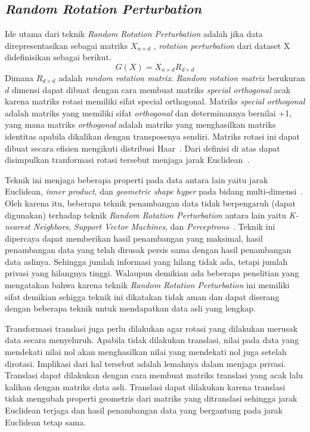 \subsection{\textit{Random Rotation Perturbation}}
\label{subsec:rrp}

Ide utama dari teknik \textit{Random Rotation Perturbation} adalah jika data direpresentasikan sebagai matriks \(X_{n \times d}\) , \textit{rotation perturbation} dari dataset X didefinisikan sebagai berikut.
\begin{equation}
	G(X) = X_{n \times d} R_{d \times d}
\end{equation}
Dimana \(R_{d \times d}\) adalah \textit{random rotation matrix}. \textit{Random rotation matrix} berukuran \(d\) dimensi dapat dibuat dengan cara membuat matriks \textit{special orthogonal} acak karena matriks rotasi memiliki sifat {special orthogonal}. Matriks \textit{special orthogonal} adalah matriks yang memiliki sifat \textit{orthogonal} dan determinannya bernilai +1, yang mana matriks \textit{orthogonal} adalah matriks yang menghasilkan matriks identitas apabila dikalikan dengan transposenya sendiri. Matriks rotasi ini dapat dibuat secara efisien mengikuti distribusi Haar~\cite{stewart:80:orthogonal}. Dari definisi di atas dapat disimpulkan tranformasi rotasi tersebut menjaga jarak Euclidean~\cite{rotation:05:chenliu}.

Teknik ini menjaga beberapa properti pada data antara lain yaitu jarak Euclidean, \textit{inner product}, dan \textit{geometric shape hyper} pada bidang multi-dimensi~\cite{rezaseifi:11:ppdm}. Oleh karena itu, beberapa teknik penambangan data tidak berpengaruh (dapat digunakan) terhadap teknik \textit{Random Rotation Perturbation} antara lain yaitu \textit{K-nearest Neighbors}, \textit{Support Vector Machines}, dan \textit{Perceptrons}~\cite{rotation:05:chenliu}. Teknik ini dipercaya dapat memberikan hasil penambangan yang maksimal, hasil penambangan data yang telah dirusak persis sama dengan hasil penambangan data aslinya. Sehingga jumlah informasi yang hilang tidak ada, tetapi jumlah privasi yang hilangnya tinggi. Walaupun demikian ada beberapa penelitian yang mengatakan bahwa karena teknik \textit{Random Rotation Perturbation} ini memiliki sifat demikian sehigga teknik ini dikatakan tidak aman dan dapat diserang dengan beberapa teknik untuk mendapatkan data asli yang lengkap.

Transformasi translasi juga perlu dilakukan agar rotasi yang dilakukan merusak data secara menyeluruh. Apabila tidak dilakukan translasi, nilai pada data yang mendekati nilai nol akan menghasilkan nilai yang mendekati nol juga setelah dirotasi. Implikasi dari hal tersebut adalah lemahnya dalam menjaga privasi. Translasi dapat dilakukan dengan cara membuat matriks translasi yang acak lalu kalikan dengan matriks data asli. Translasi dapat dilakukan karena translasi tidak mengubah properti geometris dari matriks yang ditranslasi sehingga jarak Euclidean terjaga dan hasil penambangan data yang bergantung pada jarak Euclidean tetap sama.

